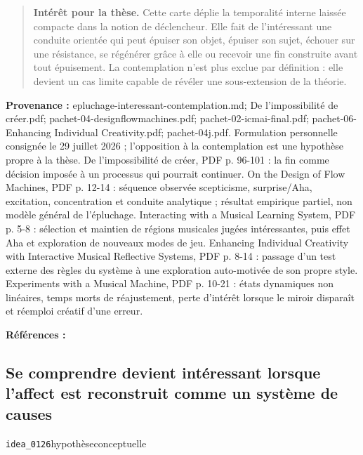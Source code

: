 \documentclass[10pt,a4paper]{article}
\begin{document}
\begin{quote}
\textbf{Intérêt pour la thèse.} Cette carte déplie la temporalité interne laissée compacte dans la notion de déclencheur. Elle fait de l'intéressant une conduite orientée qui peut épuiser son objet, épuiser son sujet, échouer sur une résistance, se régénérer grâce à elle ou recevoir une fin construite avant tout épuisement. La contemplation n'est plus exclue par définition : elle devient un cas limite capable de révéler une sous-extension de la théorie.
\end{quote}
{\footnotesize\color{metadata}\textbf{Provenance :} epluchage-interessant-contemplation.md; De l'impossibilité de créer.pdf; pachet-04-designflowmachines.pdf; pachet-02-icmai-final.pdf; pachet-06-Enhancing Individual Creativity.pdf; pachet-04j.pdf. Formulation personnelle consignée le 29 juillet 2026 ; l'opposition à la contemplation est une hypothèse propre à la thèse. De l'impossibilité de créer, PDF p. 96-101 : la fin comme décision imposée à un processus qui pourrait continuer. On the Design of Flow Machines, PDF p. 12-14 : séquence observée scepticisme, surprise/Aha, excitation, concentration et conduite analytique ; résultat empirique partiel, non modèle général de l'épluchage. Interacting with a Musical Learning System, PDF p. 5-8 : sélection et maintien de régions musicales jugées intéressantes, puis effet Aha et exploration de nouveaux modes de jeu. Enhancing Individual Creativity with Interactive Musical Reflective Systems, PDF p. 8-14 : passage d'un test externe des règles du système à une exploration auto-motivée de son propre style. Experiments with a Musical Machine, PDF p. 10-21 : états dynamiques non linéaires, temps morts de réajustement, perte d'intérêt lorsque le miroir disparaît et réemploi créatif d'une erreur.\par}
{\footnotesize\color{metadata}\textbf{Références :} \parencite{pachet2026impossibilite,pachet2004flowmachines,pachet2002continuatorinteraction,pachet2006reflective,addessi2005experiments}\par}

\subsection{Se comprendre devient intéressant lorsque l'affect est reconstruit comme un système de causes}
{\small\color{metadata} \texttt{idea\_0126}\quad\textbullet\quad hypothèse\quad\textbullet\quad conceptuelle\par}
\end{document}
